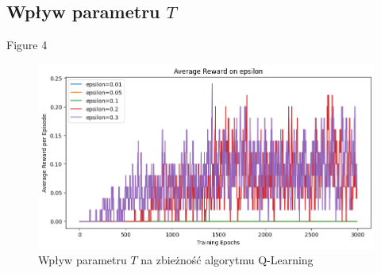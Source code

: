 \documentclass{article}
\begin{document}
\subsection{Wpływ parametru $T$}
Figure 4
\begin{figure}[h!]
    \centering
    \includegraphics[width=\textwidth]{t_impact.png}
    \caption{Wpływ parametru $T$ na zbieżność algorytmu Q-Learning}
    \label{fig:t_impact}
\end{figure}
 
\end{document}
